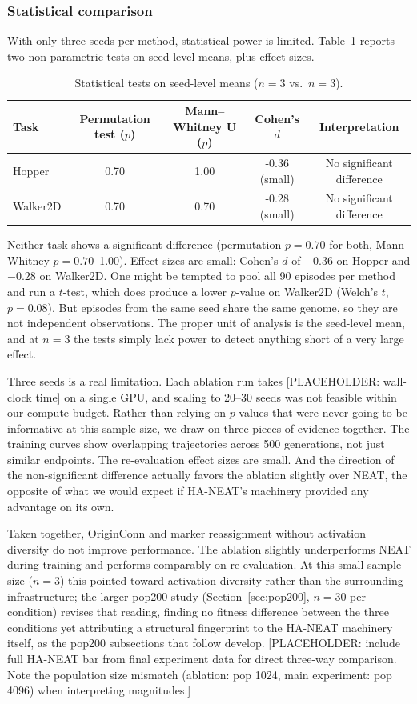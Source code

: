 \documentclass[12pt]{article}
\begin{document}
\subsubsection{Statistical comparison}

With only three seeds per method, statistical power is limited. Table~\ref{tab:ablation-statistics} reports two non-parametric tests on seed-level means, plus effect sizes.

\begin{table}[h]
\centering
\caption{Statistical tests on seed-level means ($n=3$ vs.\ $n=3$).}
\label{tab:ablation-statistics}
\begin{tabular}{lcccc}
\toprule
Task & Permutation test ($p$) & Mann--Whitney U ($p$) & Cohen's $d$ & Interpretation \\
\midrule
Hopper & 0.70 & 1.00 & -0.36 (small) & No significant difference \\
Walker2D & 0.70 & 0.70 & -0.28 (small) & No significant difference \\
\bottomrule
\end{tabular}
\end{table}

Neither task shows a significant difference (permutation $p = 0.70$ for both, Mann--Whitney $p = 0.70$--1.00). Effect sizes are small: Cohen's $d$ of $-0.36$ on Hopper and $-0.28$ on Walker2D. One might be tempted to pool all 90 episodes per method and run a $t$-test, which does produce a lower $p$-value on Walker2D (Welch's $t$, $p = 0.08$). But episodes from the same seed share the same genome, so they are not independent observations. The proper unit of analysis is the seed-level mean, and at $n = 3$ the tests simply lack power to detect anything short of a very large effect.

Three seeds is a real limitation. Each ablation run takes [PLACEHOLDER: wall-clock time] on a single GPU, and scaling to 20--30 seeds was not feasible within our compute budget. Rather than relying on $p$-values that were never going to be informative at this sample size, we draw on three pieces of evidence together. The training curves show overlapping trajectories across 500 generations, not just similar endpoints. The re-evaluation effect sizes are small. And the direction of the non-significant difference actually favors the ablation slightly over NEAT, the opposite of what we would expect if HA-NEAT's machinery provided any advantage on its own.

Taken together, OriginConn and marker reassignment without activation diversity do not improve performance. The ablation slightly underperforms NEAT during training and performs comparably on re-evaluation. At this small sample size ($n=3$) this pointed toward activation diversity rather than the surrounding infrastructure; the larger pop200 study (Section~\ref{sec:pop200}, $n=30$ per condition) revises that reading, finding no fitness difference between the three conditions yet attributing a structural fingerprint to the HA-NEAT machinery itself, as the pop200 subsections that follow develop. [PLACEHOLDER: include full HA-NEAT bar from final experiment data for direct three-way comparison. Note the population size mismatch (ablation: pop 1024, main experiment: pop 4096) when interpreting magnitudes.]
\end{document}
